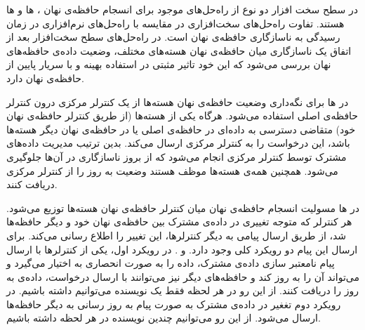 در سطح سخت افزار دو نوع از راه‌حل‌های موجود برای انسجام حافظه‌ی نهان 
، 
ها و 
ها هستند. تفاوت راه‌حل‌های سخت‌افزاری در مقایسه با راه‌حل‌های نرم‌افزاری در زمان رسیدگی به ناسازگاری حافظه‌ی نهان 
است. در راه‌حل‌های سطح سخت‌افزار بعد از اتفاق یک ناسازگاری میان حافظه‌ی نهان هسته‌های مختلف، وضعیت داده‌ی حافظه‌های نهان بررسی می‌شود که این خود تاثیر مثبتی در استفاده بهینه و با سریار پایین از حافظه‌ی نهان دارد.

در 
ها برای نگه‌داری وضعیت حافظه‌ی نهان هسته‌ها از یک کنترلر مرکزی درون کنترلر حافظه‌ی اصلی استفاده می‌شود. هرگاه یکی از هسته‌ها  (از طریق کنترلر حافظه‌ی نهان خود) متقاضی دسترسی به داده‌ای در حافظه‌ی اصلی یا در حافظه‌ی نهان دیگر هسته‌ها باشد، این درخواست را به کنترلر مرکزی ارسال می‌کند. بدین ترتیب مدیریت داده‌های مشترک توسط کنترلر مرکزی انجام می‌شود که از بروز ناسازگاری در آن‌ها جلوگیری می‌شود. همچنین همه‌ی هسته‌ها موظف هستند وضعیت به روز را از کنترلر مرکزی دریافت کنند.

در 
ها مسولیت انسجام حافظه‌ی نهان میان کنترلر حافظه‌ی نهان هسته‌ها توزیع می‌شود. هر کنترلر که متوجه تغییری در داده‌ی مشترک بین حافظه‌ی نهان خود و دیگر حافظه‌ها شد، از طریق ارسال پیامی به دیگر کنترلر‌ها، این تغییر را اطلاع رسانی می‌کند. برای ارسال این پیام دو رویکرد کلی وجود دارد. 
 و . 
در رویکرد اول، یکی از کنترلرها با ارسال پیام نامعتبر سازی داده‌ی مشترک، داده را به صورت انحصاری به اختیار می‌گیرد و می‌تواند آن را به روز کند و حافظه‌های دیگر نیز می‌توانند با ارسال درخواست، داده‌ی به روز را دریافت کنند. از این رو در هر لحظه فقط یک نویسنده می‌توانیم داشته باشیم. در رویکرد دوم تغغیر در داده‌ی مشترک به صورت پیام به روز رسانی به دیگر حافظه‌ها ارسال می‌شود. از این رو می‌توانیم چندین نویسنده در هر لحظه داشته باشیم.
